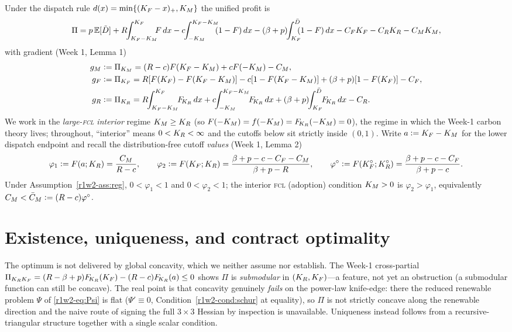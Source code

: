 Under the dispatch rule $d(x)=\min\{(K_F-x)_+,K_M\}$ the unified profit is
\begin{equation}\label{r1w2-eq:profit}
  \Pi=p\,\E[\tilde D]
  +R\!\!\int_{\KF-\KM}^{\KF}\!\!\!F\,dx
  -c\!\!\int_{-\KM}^{\KF-\KM}\!\!\!(1-F)\,dx
  -(\bp)\!\!\int_{\KF}^{\Dbar}\!\!\!(1-F)\,dx
  -\CF\KF-\CR\KR-\CM\KM ,
\end{equation}
with gradient (Week 1, Lemma 1)
\begin{align}
  g_M&\eqdef\Pi_{\KM}=(R-c)F(\KF-\KM)+cF(-\KM)-\CM,\label{r1w2-eq:gM}\\
  g_F&\eqdef\Pi_{\KF}=R[F(\KF)-F(\KF-\KM)]-c[1-F(\KF-\KM)]+(\bp)[1-F(\KF)]-\CF,\label{r1w2-eq:gF}\\
  g_R&\eqdef\Pi_{\KR}=R\!\!\int_{\KF-\KM}^{\KF}\!\!\FKR\,dx
     +c\!\!\int_{-\KM}^{\KF-\KM}\!\!\FKR\,dx+(\bp)\!\!\int_{\KF}^{\Dbar}\!\!\FKR\,dx-\CR.\label{r1w2-eq:gR}
\end{align}
We work in the \emph{large-\textsc{fcl} interior} regime $K_M\ge K_R$ (so
$F(-K_M)=f(-K_M)=F_{\!K_R}(-K_M)=0$), the regime in which the Week-1 carbon theory
lives; throughout, ``interior'' means $0<K_R<\infty$ and the cutoffs below sit
strictly inside $(0,1)$. Write $a\vcentcolon=K_F-K_M$ for the lower dispatch endpoint
and recall the distribution-free cutoff \emph{values} (Week 1, Lemma 2)
\begin{equation}\label{r1w2-eq:cut}
  \varphi_1\vcentcolon= F(a;K_R)=\frac{C_M}{R-c},\qquad
  \varphi_2\vcentcolon= F(K_F;K_R)=\frac{\beta+p-c-C_F-C_M}{\beta+p-R},\qquad
  \varphi^{\circ}\vcentcolon= F(K_F^{\circ};K_R^{\circ})=\frac{\beta+p-c-C_F}{\beta+p-c}.
\end{equation}
Under Assumption~\ref{r1w2-ass:reg}, $0<\varphi_1<1$ and $0<\varphi_2<1$; the interior
\textsc{fcl} (adoption) condition $K_M>0$ is $\varphi_2>\varphi_1$, equivalently
$C_M<\bar C_M\vcentcolon=(R-c)\varphi^{\circ}$.

\section{Existence, uniqueness, and contract optimality}\label{r1w2-sec:unique}

The optimum is not delivered by global concavity, which we neither assume nor
establish. The Week-1 cross-partial
$\Pi_{K_RK_F}=(R-\beta+p)F_{\!K_R}(K_F)-(R-c)F_{\!K_R}(a)\le0$ shows $\Pi$ is \emph{submodular}
in $(K_R,K_F)$---a feature, not yet an obstruction (a submodular function can still
be concave). The real point is that concavity genuinely \emph{fails} on the
power-law knife-edge: there the reduced renewable problem $\Psi$ of
\eqref{r1w2-eq:Psi} is flat ($\Psi'\equiv0$, Condition~\ref{r1w2-cond:schur} at equality),
so $\Pi$ is not strictly concave along the renewable direction and the naive route
of signing the full $3\times3$ Hessian by inspection is unavailable. Uniqueness
instead follows from a recursive-triangular structure together with a single
scalar condition.

